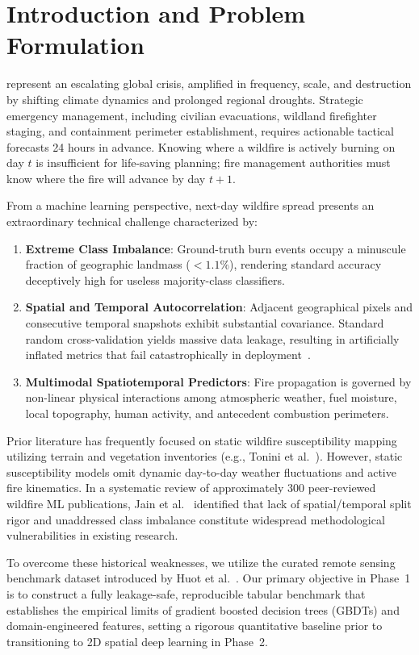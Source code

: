 \documentclass[10pt,journal,compsoc]{IEEEtran}
\begin{document}
\section{Introduction and Problem Formulation}
 represent an escalating global crisis, amplified in frequency, scale, and destruction by shifting climate dynamics and prolonged regional droughts. Strategic emergency management, including civilian evacuations, wildland firefighter staging, and containment perimeter establishment, requires actionable tactical forecasts 24 hours in advance. Knowing where a wildfire is actively burning on day $t$ is insufficient for life-saving planning; fire management authorities must know where the fire will advance by day $t+1$.

From a machine learning perspective, next-day wildfire spread presents an extraordinary technical challenge characterized by:
\begin{enumerate}
    \item \textbf{Extreme Class Imbalance}: Ground-truth burn events occupy a minuscule fraction of geographic landmass ($< 1.1\%$), rendering standard accuracy deceptively high for useless majority-class classifiers.
    \item \textbf{Spatial and Temporal Autocorrelation}: Adjacent geographical pixels and consecutive temporal snapshots exhibit substantial covariance. Standard random cross-validation yields massive data leakage, resulting in artificially inflated metrics that fail catastrophically in deployment~\cite{jain2020review}.
    \item \textbf{Multimodal Spatiotemporal Predictors}: Fire propagation is governed by non-linear physical interactions among atmospheric weather, fuel moisture, local topography, human activity, and antecedent combustion perimeters.
\end{enumerate}

Prior literature has frequently focused on static wildfire susceptibility mapping utilizing terrain and vegetation inventories (e.g., Tonini et al.~\cite{tonini2020machine}). However, static susceptibility models omit dynamic day-to-day weather fluctuations and active fire kinematics. In a systematic review of approximately 300 peer-reviewed wildfire ML publications, Jain et al.~\cite{jain2020review} identified that lack of spatial/temporal split rigor and unaddressed class imbalance constitute widespread methodological vulnerabilities in existing research. 

To overcome these historical weaknesses, we utilize the curated remote sensing benchmark dataset introduced by Huot et al.~\cite{huot2022nextday}. Our primary objective in Phase~1 is to construct a fully leakage-safe, reproducible tabular benchmark that establishes the empirical limits of gradient boosted decision trees (GBDTs) and domain-engineered features, setting a rigorous quantitative baseline prior to transitioning to 2D spatial deep learning in Phase~2.
\end{document}
